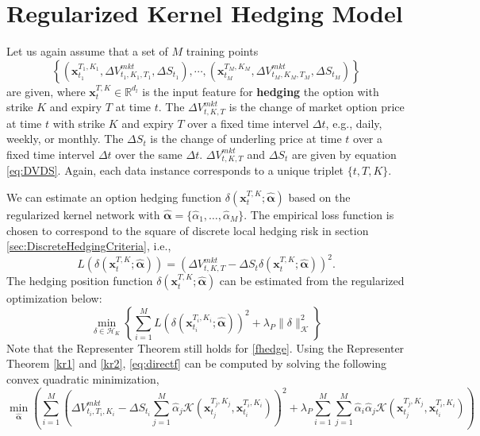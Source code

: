 \documentclass[letterpaper,12pt,titlepage,oneside,final]{book}
\numberwithin{equation}{section}
\theoremstyle{definition}
\newcommand{\vx}{\mathbf{x}}
\newcommand{\HK}{\mathcal{H}_K}
\newcommand{\DS}{\Delta S}
\newcommand{\DT}{\Delta t}
\newcommand{\Real}{\mathbb{R}}
\newcommand{\valpha}{\pmb{\widehat{\alpha}}}
\newcommand{\Vmkt}{V^{mkt}}
\newcommand{\Smkt}{S}
\begin{document}
\section{Regularized Kernel Hedging Model}
\label{sec:KernelDirect}
Let us again assume that a set of $M$ training points 
\[
 \left\{ (\vx_{t_1}^{T_1,K_1},\Delta V^{mkt}_{t_1,K_1,T_1},\Delta \Smkt_{t_1}), \cdots, (\vx_{t_M}^{T_M,K_M},\Delta V^{mkt}_{t_M,K_M,T_M},\Delta \Smkt_{t_M})\right\} \]
 are given, where
$
\vx_{t}^{T,K}  \in \Real^{d_l}
$ is the input feature for \textbf{hedging} the option with strike $K$ and expiry $T$ at time $t$. The $\Delta V^{mkt}_{t,K,T}$ is the change of  market option price at time $t$ with strike $K$ and expiry $T$ over a fixed time intervel $\DT$, e.g., daily, weekly, or monthly. The $\Delta \Smkt_{t}$ is the change of  underling price at time $t$ over a fixed time intervel $\DT$ over the same $\DT$. 
$\Delta V^{mkt}_{t,K,T}$ and  $\Delta \Smkt_{t}$  are given by
equation \eqref{eq:DVDS}.
Again, each data instance corresponds to a unique triplet $\{t,T,K\}$.

We can estimate an option hedging function $\delta(\vx_{t}^{T,K};\mathbf{\valpha})$ based on the regularized kernel network with $\valpha=\{\widehat{\alpha}_1,\dots,\widehat{\alpha}_M\}$. The empirical loss function is chosen to correspond to the square of discrete local hedging risk in section \ref{sec:DiscreteHedgingCriteria}, i.e., 
\begin{equation}\label{eq:HR}
L\left(\delta(\vx_{t}^{T,K};\valpha)\right)=\left(\Delta V^{mkt}_{t,K,T}-\DS_{t} \delta(\vx_{t}^{T,K};\valpha)\right)^2.
\end{equation}
The hedging position function $\delta(\vx_{t}^{T,K};\valpha)$  can be estimated from  the regularized optimization below:
\begin{equation} \label{fhedge}
\min_{\delta \in \HK}\left\{\sum_{i=1}^M L\left(\delta(\vx_{t_i}^{T_i,K_i};\valpha)\right)^2+\lambda_P \|\delta\|^2_\mathcal{K}\right\}
\end{equation}
Note that the Representer Theorem still holds for \eqref{fhedge}.
Using the Representer Theorem \eqref{kr1} and \eqref{kr2}, \eqref{eq:directf} can be computed by solving the following convex quadratic minimization,
\begin{equation}
	\min_{\mathbf{\valpha}} \left(  \sum_{i=1}^M \left( \Delta \Vmkt_{t_i,T_i,K_i}-\Delta S_{t_i} \sum_{j=1}^M \widehat{\alpha}_j \mathcal{K}(\vx_{t_j}^{T_j,K_j},\vx_{t_i}^{T_i,K_i}) \right)^2+\lambda_P \sum_{i=1}^M\sum_{j=1}^M  \widehat{\alpha}_i \widehat{\alpha}_j \mathcal{K}(\vx_{t_j}^{T_j,K_j},\vx_{t_i}^{T_i,K_i})\right)
	\label{eq:directf}
\end{equation}
\end{document}
